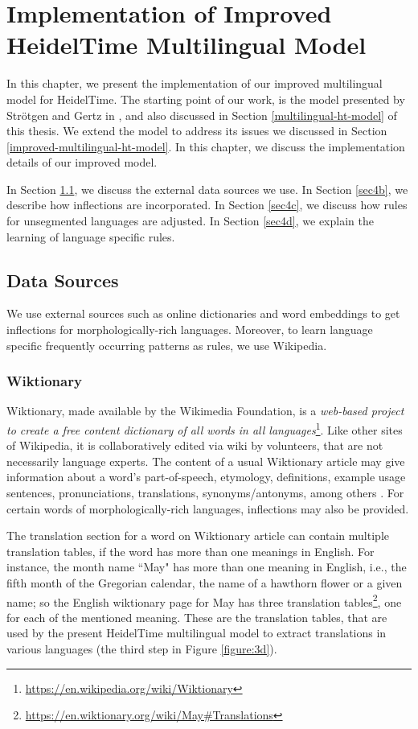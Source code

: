 \chapter{Implementation of Improved HeidelTime Multilingual Model} \label{the-chapter-4}
In this chapter, we present the implementation of our improved multilingual model for HeidelTime. The starting point of our work, is the model presented by  Str\"{o}tgen and Gertz in \cite{DBLP:conf/emnlp/StrotgenG15}, and also discussed in Section \ref{multilingual-ht-model} of this thesis. We extend the model to address its issues we discussed in Section \ref{improved-multilingual-ht-model}. In this chapter, we discuss the implementation details of our improved model. 

In Section \ref{sec4a}, we discuss the external data sources we use. In Section \ref{sec4b}, we describe how inflections are incorporated. In Section \ref{sec4c}, we discuss how rules for unsegmented languages are adjusted. In Section \ref{sec4d}, we explain the learning of language specific rules. 


\section{Data Sources} \label{sec4a}
We use external sources such as online dictionaries and word embeddings to get inflections for morphologically-rich languages. Moreover, to learn language specific frequently occurring patterns as rules, we use Wikipedia. 


\subsection{Wiktionary}
Wiktionary, made available by the Wikimedia Foundation, is a \textit{web-based project to create a free content dictionary of all words in all languages}\footnote{\url{https://en.wikipedia.org/wiki/Wiktionary}}. Like other sites of Wikipedia, it is collaboratively edited via wiki by volunteers, that are not necessarily language experts. The content of a usual Wiktionary article may give information about a word's part-of-speech, etymology, definitions, example usage sentences, pronunciations, translations, synonyms/antonyms, among others \cite{navarro2009wiktionary}. For certain words of morphologically-rich languages, inflections may also be provided.
	
The translation section for a word on Wiktionary article can contain multiple translation tables, if the word has more than one meanings in English. For instance, the month name ``May" has more than one meaning in English, i.e., the fifth month of the Gregorian calendar, the name of a hawthorn flower or a given name; so the English wiktionary page for May has three translation tables\footnote{\url{https://en.wiktionary.org/wiki/May\#Translations}}, one for each of the mentioned meaning. These are the translation tables, that are used by the present HeidelTime multilingual model \cite{DBLP:conf/emnlp/StrotgenG15} to extract translations in various languages (the third step in Figure \ref{figure:3d}).
	
